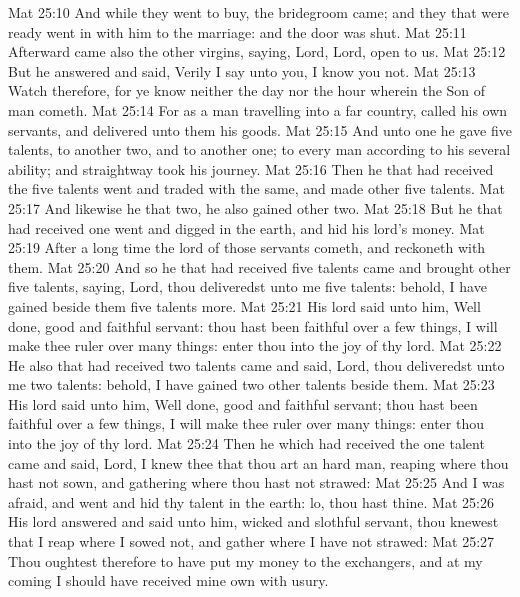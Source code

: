 \vs Mat 25:10 And while they went to buy, the bridegroom came; and they that were ready went in with him to the marriage: and the door was shut.
\vs Mat 25:11 Afterward came also the other virgins, saying, Lord, Lord, open to us.
\vs Mat 25:12 But he answered and said, Verily I say unto you, I know you not.
\vs Mat 25:13 Watch therefore, for ye know neither the day nor the hour wherein the Son of man cometh.
\vs Mat 25:14 For  as a man travelling into a far country,  called his own servants, and delivered unto them his goods.
\vs Mat 25:15 And unto one he gave five talents, to another two, and to another one; to every man according to his several ability; and straightway took his journey.
\vs Mat 25:16 Then he that had received the five talents went and traded with the same, and made  other five talents.
\vs Mat 25:17 And likewise he that  two, he also gained other two.
\vs Mat 25:18 But he that had received one went and digged in the earth, and hid his lord's money.
\vs Mat 25:19 After a long time the lord of those servants cometh, and reckoneth with them.
\vs Mat 25:20 And so he that had received five talents came and brought other five talents, saying, Lord, thou deliveredst unto me five talents: behold, I have gained beside them five talents more.
\vs Mat 25:21 His lord said unto him, Well done,  good and faithful servant: thou hast been faithful over a few things, I will make thee ruler over many things: enter thou into the joy of thy lord.
\vs Mat 25:22 He also that had received two talents came and said, Lord, thou deliveredst unto me two talents: behold, I have gained two other talents beside them.
\vs Mat 25:23 His lord said unto him, Well done, good and faithful servant; thou hast been faithful over a few things, I will make thee ruler over many things: enter thou into the joy of thy lord.
\vs Mat 25:24 Then he which had received the one talent came and said, Lord, I knew thee that thou art an hard man, reaping where thou hast not sown, and gathering where thou hast not strawed:
\vs Mat 25:25 And I was afraid, and went and hid thy talent in the earth: lo,  thou hast  thine.
\vs Mat 25:26 His lord answered and said unto him,  wicked and slothful servant, thou knewest that I reap where I sowed not, and gather where I have not strawed:
\vs Mat 25:27 Thou oughtest therefore to have put my money to the exchangers, and  at my coming I should have received mine own with usury.

